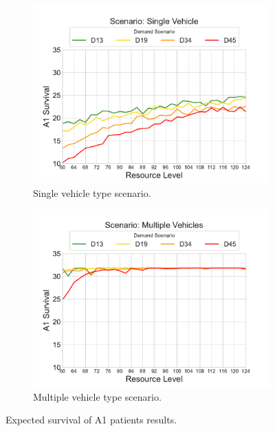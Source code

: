 \documentclass[preprint,12pt]{elsarticle}
\begin{document}
\begin{figure}
\begin{center}
\begin{subfigure}{0.42\textwidth}
\includegraphics[width=\textwidth]{img/plots/single_A1Survival}
\caption{Single vehicle type scenario.}
\label{fig:results_a1survival_single}
\end{subfigure}
\begin{subfigure}{0.42\textwidth}
\includegraphics[width=\textwidth]{img/plots/multiple_A1Survival}
\caption{Multiple vehicle type scenario.}
\label{fig:results_a1survival_multiple}
\end{subfigure}
\end{center}
\caption{Expected survival of A1 patients results.}
\label{fig:results_a1survival}
\end{figure}
\end{document}
